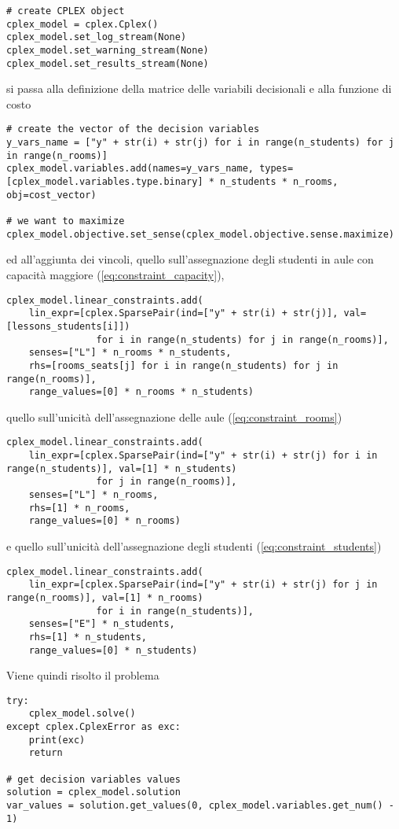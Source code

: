 \begin{verbatim}
# create CPLEX object
cplex_model = cplex.Cplex()
cplex_model.set_log_stream(None)
cplex_model.set_warning_stream(None)
cplex_model.set_results_stream(None)
\end{verbatim} 

\noindent
si passa alla definizione della matrice delle variabili decisionali e alla funzione di costo

\begin{verbatim}
# create the vector of the decision variables
y_vars_name = ["y" + str(i) + str(j) for i in range(n_students) for j in range(n_rooms)]
cplex_model.variables.add(names=y_vars_name, types=[cplex_model.variables.type.binary] * n_students * n_rooms, obj=cost_vector)

# we want to maximize
cplex_model.objective.set_sense(cplex_model.objective.sense.maximize)
\end{verbatim} 

\noindent
ed all'aggiunta dei vincoli, quello sull'assegnazione degli studenti 
in aule con capacità maggiore (\ref{eq:constraint_capacity}),

\begin{verbatim}
cplex_model.linear_constraints.add(
    lin_expr=[cplex.SparsePair(ind=["y" + str(i) + str(j)], val=[lessons_students[i]])
                for i in range(n_students) for j in range(n_rooms)],
    senses=["L"] * n_rooms * n_students,
    rhs=[rooms_seats[j] for i in range(n_students) for j in range(n_rooms)],
    range_values=[0] * n_rooms * n_students)
\end{verbatim} 

\noindent
quello sull'unicità dell'assegnazione delle aule (\ref{eq:constraint_rooms})

\begin{verbatim}
cplex_model.linear_constraints.add(
    lin_expr=[cplex.SparsePair(ind=["y" + str(i) + str(j) for i in range(n_students)], val=[1] * n_students)
                for j in range(n_rooms)],
    senses=["L"] * n_rooms,
    rhs=[1] * n_rooms,
    range_values=[0] * n_rooms)
\end{verbatim} 

\noindent
e quello sull'unicità dell'assegnazione degli studenti (\ref{eq:constraint_students})

\begin{verbatim}
cplex_model.linear_constraints.add(
    lin_expr=[cplex.SparsePair(ind=["y" + str(i) + str(j) for j in range(n_rooms)], val=[1] * n_rooms)
                for i in range(n_students)],
    senses=["E"] * n_students,
    rhs=[1] * n_students,
    range_values=[0] * n_students)
\end{verbatim} 

Viene quindi risolto il problema

\begin{verbatim}
try:
    cplex_model.solve()
except cplex.CplexError as exc:
    print(exc)
    return

# get decision variables values
solution = cplex_model.solution
var_values = solution.get_values(0, cplex_model.variables.get_num() - 1)
\end{verbatim} 

